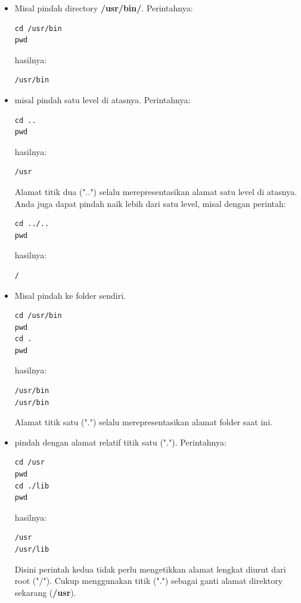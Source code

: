 \documentclass[12pt,]{article}
\begin{document}
\begin{itemize}
\begin{itemize}
			\item Misal pindah directory \textbf{/usr/bin/}.
			Perintahnya:
			\begin{verbatim}
cd /usr/bin
pwd
			\end{verbatim}
			hasilnya:
			\begin{verbatim}
/usr/bin
			\end{verbatim}
			
			\item misal pindah satu level di atasnya.
			Perintahnya:
			\begin{verbatim}
cd ..
pwd
			\end{verbatim}
			hasilnya:
			\begin{verbatim}
/usr
			\end{verbatim}
			Alamat titik dua ("..")	selalu merepresentasikan alamat	satu level di atasnya.
			Anda juga dapat pindah naik lebih dari satu level, misal dengan perintah:
			\begin{verbatim}
cd ../..
pwd
			\end{verbatim}
			hasilnya:
			\begin{verbatim}
/
			\end{verbatim}	
			
			\item Misal pindah ke folder sendiri.
			\begin{verbatim}
cd /usr/bin
pwd
cd .
pwd
			\end{verbatim}
			hasilnya:
			\begin{verbatim}
/usr/bin
/usr/bin
			\end{verbatim}
			Alamat titik satu (".") selalu merepresentasikan alamat	folder saat ini.
			
			\item pindah dengan alamat relatif titik satu (".").
			Perintahnya:
			\begin{verbatim}
cd /usr
pwd
cd ./lib
pwd
			\end{verbatim}
			hasilnya:
			\begin{verbatim}
/usr
/usr/lib
			\end{verbatim}
			Disini perintah kedua tidak perlu mengetikkan alamat lengkat diurut dari root ("/").
			Cukup menggunakan titik (".") sebagai ganti alamat direktory sekarang (\textbf{/usr}).
			

\end{itemize}
\end{itemize}
\end{document}
